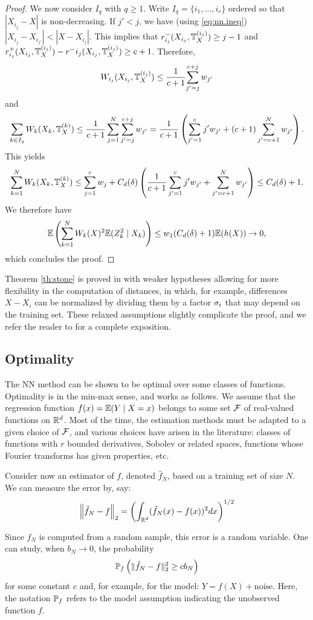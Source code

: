 \begin{proof}
We now consider $I_q$ with $q\geq 1$. Write $I_q = \{i_1, \ldots, i_r\}$ ordered so that $|X_{i_j} - X|$ is non-decreasing. If $j'<j$, we have (using \eqref{eq:nn.ineq})
$|X_{i_j}-X_{i_{j'}}| < |X-X_{i_j}|$. This implies that $r^-_{i_j}(X_{i_j}, {\mathbb T}_X^{(i_j)}) \geq j-1$ and $r^+_{i_j}(X_{i_j}, {\mathbb T}_X^{(i_j)}) - r^-{i_j}(X_{i_j}, {\mathbb T}_X^{(i_j)}) \geq c+1$. Therefore,
\[
 W_{i_j}(X_{i_j}, {\mathbb T}_X^{(i_j)}) \leq \frac1{c+1}{\sum_{j'=j}^{c+j} w_{j'}}
 \]
 and
\[
\sum_{k\in I_q} W_{k}(X_k, {\mathbb T}_X^{(k)}) \leq \frac1{c+1}\sum_{j=1}^N \sum_{j'=j}^{c+j} w_{j'} = \frac1{c+1} \left(\sum_{j'=1}^c j'w_{j'} + (c+1) \sum_{j'=c+1}^N w_{j'}\right).
\]
This yields
\[
\sum_{k=1}^N W_{k}(X_k, {\mathbb T}_X^{(k)}) \leq \sum_{j=1}^c w_j + C_d(\delta) \left(\frac1{c+1}\sum_{j'=1}^c j'w_{j'} + \sum_{j'=c+1}^N w_{j'}\right)
\leq C_d(\delta) +1.
\]
We therefore have 
\[
\bm{\mathbb E}\left(\sum_{k=1}^N W_{k}(X)^2 \bm{\mathbb E}( Z_k^2 \mid X_k)\right)\leq w_1(C_d(\delta) +1) \bm{\mathbb E}(h(X)) \to 0,
\]
which concludes the proof.
 \end{proof}


Theorem \ref{th:stone} is proved in \citet{stone1977consistent} with weaker hypotheses allowing for more flexibility in the computation of distances, in which, for example, differences $X-X_i$ can be normalized by dividing them by a factor $\sigma_i$ that may depend on the training set. These relaxed assumptions slightly complicate the proof, and we refer the reader to \citet{stone1977consistent} for a complete exposition. 


\subsection{Optimality}
The NN method can be shown to be optimal over some classes of
functions. Optimality is in the min-max sense, and works as follows. We assume that the regression function $f(x) = \bm{\mathbb E}(Y\mid X=x)$
belongs to some set ${\mathcal F}$ of real-valued functions on ${\mathbb{R}}^d$. Most of
the time, the estimation methods must be adapted to a given choice of
${\mathcal F}$, and various choices have arisen  in the literature: classes of
functions with $r$ bounded derivatives, Sobolev or related spaces,
functions whose Fourier transforms has given properties, etc.

Consider now an estimator of $f$, denoted $\hat f_N$, based on a
training set of size $N$. We can measure the error by, say:
$$
\left\| \hat f_N - f \right\|_2 = \left(\int_{{\mathbb{R}}^d} (\hat f_N(x) - f(x))^2
dx\right)^{1/2}
$$

Since $\hat f_N$ is computed from a random sample, this error is a
random variable. One can study, when $b_N\to 0$, the probability
$$
\bm{\mathbb P}_f\left(\|\hat f_N - f\|^2_2 \geq c b_N\right)
$$
for some constant $c$ and, for example, for the model: $Y = f(X) +
\text{noise}$. Here, the notation $\bm{\mathbb P}_f$ refers to the model assumption indicating the unobserved function $f$.

